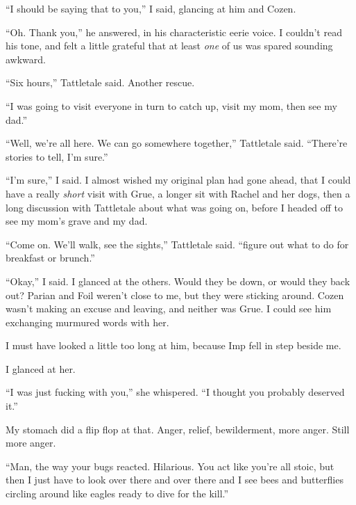 ``I should be saying that to you,'' I said, glancing at him and Cozen.



``Oh.  Thank you,'' he answered, in his characteristic eerie voice.  I couldn't read his tone, and felt a little grateful that at least \emph{one} of us was spared sounding awkward.



``Six hours,'' Tattletale said.  Another rescue.



``I was going to visit everyone in turn to catch up, visit my mom, then see my dad.''



``Well, we're all here.  We can go somewhere together,'' Tattletale said.  ``There're stories to tell, I'm sure.''



``I'm sure,'' I said.  I almost wished my original plan had gone ahead, that I could have a really \emph{short} visit with Grue, a longer sit with Rachel and her dogs, then a long discussion with Tattletale about what was going on, before I headed off to see my mom's grave and my dad.



``Come on.  We'll walk, see the sights,'' Tattletale said.  ``figure out what to do for breakfast or brunch.''



``Okay,'' I said.  I glanced at the others.  Would they be down, or would they back out?  Parian and Foil weren't close to me, but they were sticking around.  Cozen wasn't making an excuse and leaving, and neither was Grue.  I could see him exchanging murmured words with her.



I must have looked a little too long at him, because Imp fell in step beside me.



I glanced at her.



``I was just fucking with you,'' she whispered.  ``I thought you probably deserved it.''



My stomach did a flip flop at that.  Anger, relief, bewilderment, more anger.  Still more anger.



``Man, the way your bugs reacted.  Hilarious.  You act like you're all stoic, but then I just have to look over there and over there and I see bees and butterflies circling around like eagles ready to dive for the kill.''



